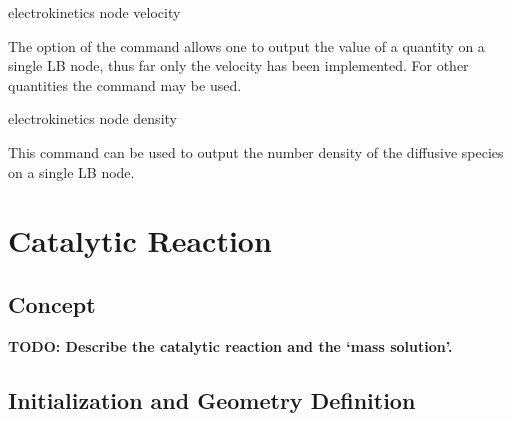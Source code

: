 \begin{essyntax}
  electrokinetics node    velocity
  \begin{features}
  \end{features}
\end{essyntax}
The  option of the  command allows one to output 
the value of a quantity on a single LB node, thus far only the velocity has been
implemented. For other quantities the  command may be used. 

\begin{essyntax}
  electrokinetics  node    density
  \begin{features}
  \end{features}
\end{essyntax}
This command can be used to output the number density of the 
diffusive species on a single LB node.

\section{Catalytic Reaction}

\subsection{Concept}

\textbf{TODO: Describe the catalytic reaction and the `mass solution'.}

\subsection{\label{ssec:ek-reac-init}Initialization and Geometry Definition}

